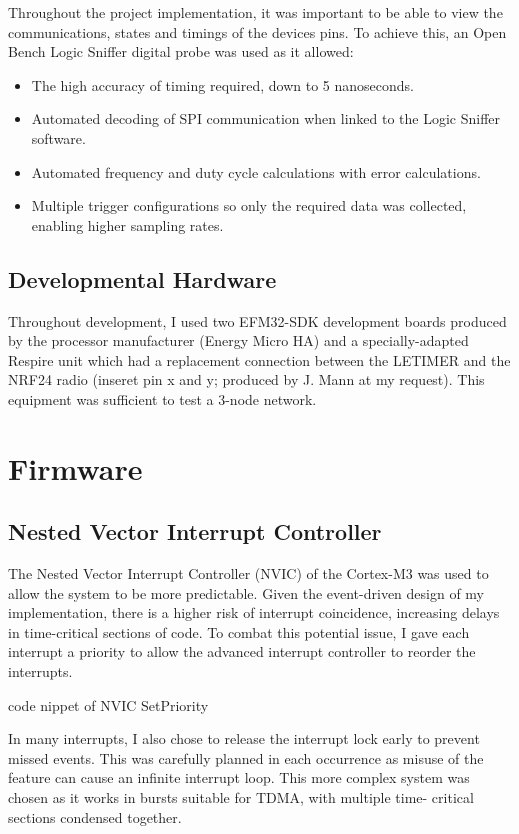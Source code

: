 Throughout the project implementation, it was important to be able to view the communications,
states and timings of the devices pins. To achieve this, an Open Bench Logic Sniffer digital probe was
used as it allowed:
\begin{itemize}
  \item The high accuracy of timing required, down to 5 nanoseconds.
  \item Automated decoding of SPI communication when linked to the Logic Sniffer software.
  \item Automated frequency and duty cycle calculations with error calculations.
  \item Multiple trigger configurations so only the required data was collected, enabling higher
        sampling rates.
\end{itemize}

\subsection{Developmental Hardware}
Throughout development, I used two EFM32-SDK development boards produced by the processor
manufacturer (Energy Micro HA) and a specially-adapted Respire unit which had a replacement
connection between the LETIMER and the NRF24 radio (inseret pin x and y; produced by J. Mann at
my request). This equipment was sufficient to test a 3-node network.

\section{Firmware}

\subsection{Nested Vector Interrupt Controller}
The Nested Vector Interrupt Controller (NVIC) of the Cortex-M3 was used to allow the system to be
more predictable. Given the event-driven design of my implementation, there is a higher risk of
interrupt coincidence, increasing delays in time-critical sections of code. To combat this potential
issue, I gave each interrupt a priority to allow the advanced interrupt controller to reorder the
interrupts.

{code nippet of NVIC SetPriority}

In many interrupts, I also chose to release the interrupt lock early to prevent missed events. This was
carefully planned in each occurrence as misuse of the feature can cause an infinite interrupt loop.
This more complex system was chosen as it works in bursts suitable for TDMA, with multiple time-
critical sections condensed together.


